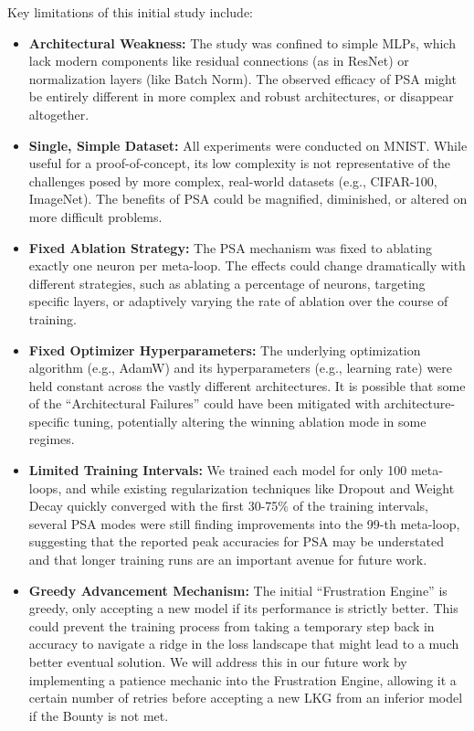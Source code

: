 \documentclass[conference]{IEEEtran}
\begin{document}
Key limitations of this initial study include:
\begin{itemize}
    \item \textbf{Architectural Weakness:} The study was confined to simple MLPs, which lack modern components like residual connections (as in ResNet)\cite{b8} or normalization layers (like Batch Norm)\cite{b10}. The observed efficacy of PSA might be entirely different in more complex and robust architectures, or disappear altogether.
    \item \textbf{Single, Simple Dataset:} All experiments were conducted on MNIST. While useful for a proof-of-concept, its low complexity is not representative of the challenges posed by more complex, real-world datasets (e.g., CIFAR-100, ImageNet). The benefits of PSA could be magnified, diminished, or altered on more difficult problems.
    \item \textbf{Fixed Ablation Strategy:} The PSA mechanism was fixed to ablating exactly one neuron per meta-loop. The effects could change dramatically with different strategies, such as ablating a percentage of neurons, targeting specific layers, or adaptively varying the rate of ablation over the course of training.
    \item \textbf{Fixed Optimizer Hyperparameters:} The underlying optimization algorithm (e.g., AdamW\cite{b11}) and its hyperparameters (e.g., learning rate) were held constant across the vastly different architectures. It is possible that some of the ``Architectural Failures'' could have been mitigated with architecture-specific tuning, potentially altering the winning ablation mode in some regimes.
    \item \textbf{Limited Training Intervals:} We trained each model for only 100 meta-loops, and while existing regularization techniques like Dropout and Weight Decay quickly converged with the first 30-75\% of the training intervals, several PSA modes were still finding improvements into the 99-th meta-loop, suggesting that the reported peak accuracies for PSA may be understated and that longer training runs are an important avenue for future work.
    \item \textbf{Greedy Advancement Mechanism:} The initial ``Frustration Engine'' is greedy, only accepting a new model if its performance is strictly better. This could prevent the training process from taking a temporary step back in accuracy to navigate a ridge in the loss landscape that might lead to a much better eventual solution. We will address this in our future work by implementing a patience mechanic into the Frustration Engine, allowing it a certain number of retries before accepting a new LKG from an inferior model if the Bounty is not met.
\end{itemize}
\end{document}
